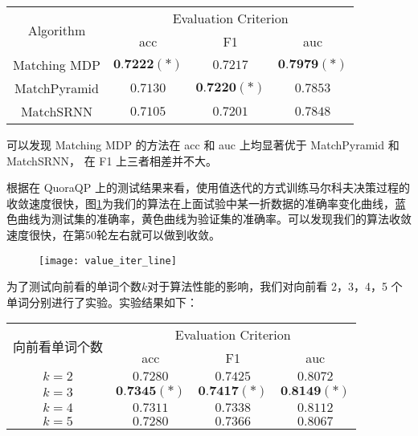 \begin{table}[!htbp]
    \label{tab:MDP_test}
    \centering
    \footnotesize%
    \setlength{\tabcolsep}{4pt}%
    \renewcommand{\arraystretch}{1.2}%
    \begin{tabular}{cccc}
        \hline
        \multirow{2}{*}{Algorithm} &
        \multicolumn{3}{c}{\multirow{1}{*}{Evaluation Criterion}} \\
        \cline{2-4} & acc & F1 & auc \\
        \hline
        Matching MDP & $\textbf{0.7222}(*)$ & $0.7217$ & $\textbf{0.7979}(*)$ \\
        MatchPyramid & $0.7130$ & $\textbf{0.7220}(*)$ & $0.7853$ \\
        MatchSRNN & $0.7105$ & $0.7201$ & $0.7848$\\
        \hline
    \end{tabular}
\end{table}

可以发现 Matching MDP 的方法在 acc 和 auc 上均显著优于 MatchPyramid 和 MatchSRNN， 在 F1 上三者相差并不大。

根据在 QuoraQP 上的测试结果来看，使用值迭代的方式训练马尔科夫决策过程的收敛速度很快，图\ref{fig:value_iter_line}为我们的算法在上面试验中某一折数据的准确率变化曲线，蓝色曲线为测试集的准确率，黄色曲线为验证集的准确率。可以发现我们的算法收敛速度很快，在第50轮左右就可以做到收敛。

\begin{figure}[H]
    \centering
    \texttt{[image: value\_iter\_line]}
    \label{fig:value_iter_line}
\end{figure}

为了测试向前看的单词个数$k$对于算法性能的影响，我们对向前看 2，3，4，5 个单词分别进行了实验。实验结果如下：

\begin{table}[!htbp]
    \label{tab:MDP_forwrd_word}
    \centering
    \footnotesize%
    \setlength{\tabcolsep}{4pt}%
    \renewcommand{\arraystretch}{1.2}%
    \begin{tabular}{cccc}
        \hline
        \multirow{2}{*}{向前看单词个数} &
        \multicolumn{3}{c}{\multirow{1}{*}{Evaluation Criterion}} \\
        \cline{2-4} & acc & F1 & auc \\
        \hline
        $k=2$ & $0.7280$ & $0.7425$ & $0.8072$ \\
        $k=3$ & $\textbf{0.7345}(*)$ & $\textbf{0.7417}(*)$ & $\textbf{0.8149}(*)$ \\
        $k=4$ & $0.7311$ & $0.7338$ & $0.8112$\\
        $k=5$ & $0.7280$ & $0.7366$ & $0.8067$\\
        \hline
    \end{tabular}
\end{table}

